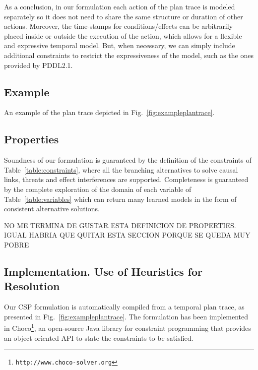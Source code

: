 \documentclass[runningheads]{llncs}
\begin{document}
As a conclusion, in our formulation each action of the plan trace is modeled separately so it does not need to share the same structure or duration of other actions. Moreover, the time-stamps for conditions/effects can be arbitrarily placed inside or outside the execution of the action, which allows for a flexible and expressive temporal model. But, when necessary, we can simply include additional constraints to restrict the expressiveness of the model, such as the ones provided by PDDL2.1.


\subsection{Example}
\label{section:example}

An example of the plan trace depicted in Fig.~\ref{fig:exampleplantrace}.







\subsection{Properties}

Soundness of our formulation is guaranteed by the definition of the constraints of Table~\ref{table:constraints}, where all the branching alternatives to solve causal links, threats and effect interferences are supported. Completeness is guaranteed by the complete exploration of the domain of each variable of Table~\ref{table:variables} which can return many learned models in the form of consistent alternative solutions.


NO ME TERMINA DE GUSTAR ESTA DEFINICION DE PROPERTIES. IGUAL HABRIA QUE QUITAR ESTA SECCION PORQUE SE QUEDA MUY POBRE








\subsection{Implementation. Use of Heuristics for Resolution}
\label{sec:implementation}

Our CSP formulation is automatically compiled from a temporal plan trace, as presented in Fig.~\ref{fig:exampleplantrace}. The formulation has been implemented in \textsf{Choco}\footnote{\texttt{http://www.choco-solver.org}}, an open-source Java library for constraint programming that provides an object-oriented API to state the constraints to be satisfied.
\end{document}
